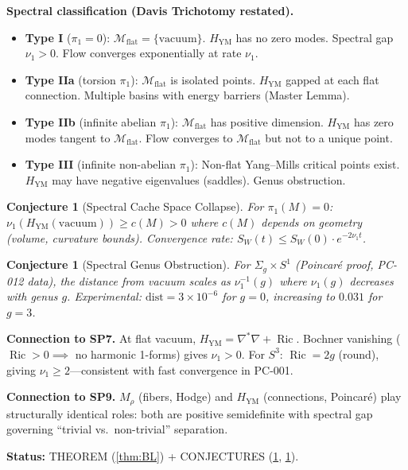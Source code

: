 \documentclass[11pt]{article}
\newtheorem{conjecture}[theorem]{Conjecture}
\theoremstyle{definition}
\theoremstyle{remark}
\newcommand{\Ric}{\operatorname{Ric}}
\newcommand{\Mflat}{\mathcal{M}_{\mathrm{flat}}}
\newcommand{\HYM}{H_{\mathrm{YM}}}
\newcommand{\SW}{S_W}
\begin{document}
\textbf{Spectral classification (Davis Trichotomy restated).}
\begin{itemize}[nosep]
\item \textbf{Type I} ($\pi_1 = 0$): $\Mflat = \{\text{vacuum}\}$. $\HYM$ has no zero modes. Spectral gap $\nu_1 > 0$. Flow converges exponentially at rate $\nu_1$.
\item \textbf{Type IIa} (torsion $\pi_1$): $\Mflat$ is isolated points. $\HYM$ gapped at each flat connection. Multiple basins with energy barriers (Master Lemma).
\item \textbf{Type IIb} (infinite abelian $\pi_1$): $\Mflat$ has positive dimension. $\HYM$ has zero modes tangent to $\Mflat$. Flow converges to $\Mflat$ but not to a unique point.
\item \textbf{Type III} (infinite non-abelian $\pi_1$): Non-flat Yang--Mills critical points exist. $\HYM$ may have negative eigenvalues (saddles). Genus obstruction.
\end{itemize}

\begin{conjecture}[Spectral Cache Space Collapse]\label{conj:cache}
For $\pi_1(M) = 0$: $\nu_1(\HYM(\text{vacuum})) \ge c(M) > 0$ where $c(M)$ depends on geometry (volume, curvature bounds). Convergence rate: $\SW(t) \le \SW(0)\cdot e^{-2\nu_1 t}$.
\end{conjecture}

\begin{conjecture}[Spectral Genus Obstruction]\label{conj:genus}
For $\Sigma_g \times S^1$ (Poincar\'{e} proof, PC-012 data), the distance from vacuum scales as $\nu_1^{-1}(g)$ where $\nu_1(g)$ decreases with genus $g$. Experimental: $\mathrm{dist} = 3 \times 10^{-6}$ for $g = 0$, increasing to $0.031$ for $g = 3$.
\end{conjecture}

\textbf{Connection to SP7.} At flat vacuum, $\HYM = \nabla^*\nabla + \Ric$. Bochner vanishing ($\Ric > 0 \implies$ no harmonic 1-forms) gives $\nu_1 > 0$. For $S^3$: $\Ric = 2g$ (round), giving $\nu_1 \ge 2$---consistent with fast convergence in PC-001.

\textbf{Connection to SP9.} $M_\rho$ (fibers, Hodge) and $\HYM$ (connections, Poincar\'{e}) play structurally identical roles: both are positive semidefinite with spectral gap governing ``trivial vs.\ non-trivial'' separation.

\textbf{Status:} THEOREM (\ref{thm:BL}) + CONJECTURES (\ref{conj:cache}, \ref{conj:genus}).


\end{document}

